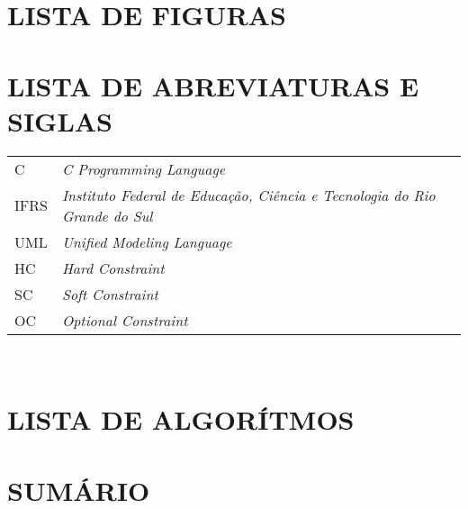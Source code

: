 \documentclass[12pt,a4paper]{article}
\begin{document}
	\thispagestyle{empty}
	\section*{LISTA DE FIGURAS}

	\listoffigures

	\newpage


	\thispagestyle{empty}
	\section*{LISTA DE ABREVIATURAS E SIGLAS}

	\begin{tabular}{p{3cm} p{}}
	  C & \textit{C Programming Language} \\
	  IFRS & \textit{Instituto Federal de Educação, Ciência e Tecnologia do Rio Grande do Sul} \\
	  UML & \textit{Unified Modeling Language} \\
	  HC & \textit{Hard Constraint} \\
	  SC & \textit{Soft Constraint} \\
	  OC & \textit{Optional Constraint}
	\end{tabular}\\


	\newpage


	\thispagestyle{empty}
	\section*{LISTA DE ALGORÍTMOS}


	\newpage



	\thispagestyle{empty}
	\section*{SUMÁRIO}

	\begingroup
		\let\clearpage\relax
		\vspace{-1cm} %
		\tableofcontents
	\endgroup
\end{document}
